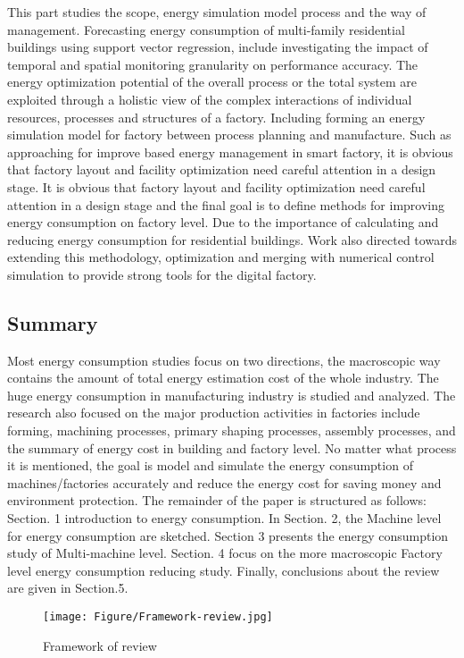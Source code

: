 This part studies the scope, energy simulation model process and the way of management. Forecasting energy consumption of multi-family residential buildings using support vector regression, include investigating the impact of temporal and spatial monitoring granularity on performance accuracy. The energy optimization potential of the overall process or the total system are exploited through a holistic view of the complex interactions of individual resources, processes and structures of a factory. Including forming an energy simulation model for factory between process planning and manufacture. Such as approaching for improve based energy management in smart factory, it is obvious that factory layout and facility optimization need careful attention in a design stage. It is obvious that factory layout and facility optimization need careful attention in a design stage and the final goal is to define methods for improving energy consumption on factory level. Due to the importance of calculating and reducing energy consumption for residential buildings. Work also directed towards extending this methodology, optimization and merging with numerical control simulation to provide strong tools for the digital factory.

\subsection{Summary}

Most energy consumption studies focus on two directions, the macroscopic way contains the amount of total energy estimation cost of the whole industry. The huge energy consumption in manufacturing industry is studied and analyzed. The research also focused on the major production activities in factories include forming, machining processes, primary shaping processes, assembly processes, and the summary of energy cost in building and factory level. No matter what process it is mentioned, the goal is model and simulate the energy consumption of machines/factories accurately and reduce the energy cost for saving money and environment protection. The remainder of the paper is structured as follows: Section. 1 introduction to energy consumption. In Section. 2, the Machine level for energy consumption are sketched. Section 3 presents the energy consumption study of Multi-machine level. Section. 4 focus on the more macroscopic Factory level energy consumption reducing study. Finally, conclusions about the review are given in Section.5.

\begin{figure}[h!]
	\centering
	\texttt{[image: Figure/Framework-review.jpg]}
	\caption{Framework of review}
	\label{fig:FrameworkReview}
\end{figure}
